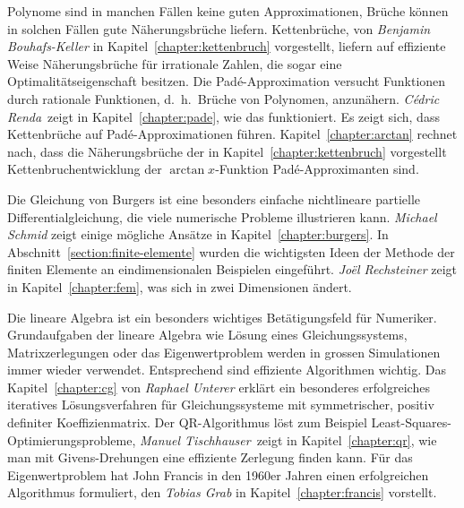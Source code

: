 Polynome sind in manchen Fällen keine guten Approximationen,
Brüche können in solchen Fällen gute Näherungsbrüche liefern.
Kettenbrüche, von {\em Benjamin Bouhafs-Keller} in
Kapitel~\ref{chapter:kettenbruch} vorgestellt, liefern auf effiziente
Weise Näherungsbrüche für irrationale Zahlen, die sogar eine
Optimalitätseigenschaft besitzen.
%
%
Die Padé-Approximation versucht Funktionen durch rationale
Funktionen, d.~h.~Brüche von Polynomen, anzunähern.
{\em Cédric Renda} zeigt in Kapitel~\ref{chapter:pade}, wie das
funktioniert.
Es zeigt sich, dass Kettenbrüche auf Padé-Approximationen führen.
Kapitel~\ref{chapter:arctan} rechnet nach, dass die Näherungsbrüche der
in Kapitel~\ref{chapter:kettenbruch} vorgestellt Kettenbruchentwicklung
der $\arctan x$-Funktion Padé-Approximanten sind.
%
%
%
%

Die Gleichung von Burgers ist eine besonders einfache nichtlineare
partielle Differentialgleichung, die viele numerische Probleme
illustrieren kann.
%
%
{\em Michael Schmid} zeigt einige mögliche Ansätze in
Kapitel~\ref{chapter:burgers}.
%
In Abschnitt~\ref{section:finite-elemente} wurden die wichtigsten Ideen
der Methode der finiten Elemente an eindimensionalen Beispielen eingeführt.
{\em Joël Rechsteiner} zeigt in Kapitel~\ref{chapter:fem}, was sich in
zwei Dimensionen ändert.
%
%

Die lineare Algebra ist ein besonders wichtiges Betätigungsfeld für
Numeriker.
Grundaufgaben der lineare Algebra wie Lösung eines Gleichungssystems,
Matrixzerlegungen oder das Eigenwertproblem werden in grossen
Simulationen immer wieder verwendet.
%
%
Entsprechend sind effiziente Algorithmen wichtig.
Das Kapitel~\ref{chapter:cg} von {\em Raphael Unterer} erklärt
ein besonderes erfolgreiches iteratives
Lösungsverfahren für Gleichungssysteme mit symmetrischer, positiv
definiter Koeffizienmatrix.
Der QR-Algorithmus löst zum Beispiel Least-Squares-Optimierungsprobleme,
%
{\em Manuel Tischhauser} zeigt in Kapitel~\ref{chapter:qr}, wie man mit
Givens-Drehungen eine effiziente Zerlegung finden kann.
%
%
Für das Eigenwertproblem hat John Francis in den 1960er Jahren einen
erfolgreichen Algorithmus formuliert, den {\em Tobias Grab} in
Kapitel~\ref{chapter:francis} vorstellt.
%
%

